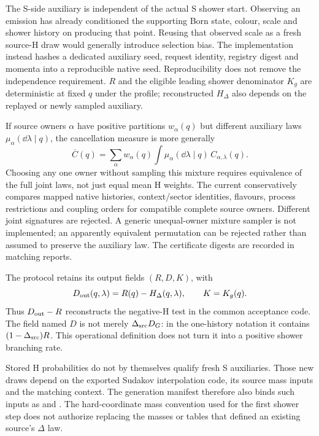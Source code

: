 The S-side auxiliary is independent of the actual S shower start.
Observing an emission has already conditioned the supporting Born
state, colour, scale and shower history on producing that point.
Reusing that observed scale as a fresh source-H draw would generally
introduce selection bias.
The implementation instead hashes a dedicated auxiliary seed, request
identity, registry digest and momenta into a reproducible native seed.
Reproducibility does not remove the independence requirement.
$R$ and the eligible leading shower denominator $K_g$ are deterministic
at fixed $q$ under the profile; reconstructed $H_\Delta$ also depends
on the replayed or newly sampled auxiliary.

If source owners $\alpha$ have positive partitions $w_\alpha(q)$
but different auxiliary laws $\mu_\alpha(\dd\lambda\mid q)$,
the cancellation measure is more generally
\begin{equation}
 \overline C(q)=
   \sum_\alpha w_\alpha(q)
       \int \mu_\alpha(\dd\lambda\mid q)\,C_{\alpha,\lambda}(q).
 \label{eq:delta-owner-mixture}
\end{equation}
Choosing any one owner without sampling this mixture requires
equivalence of the full joint laws, not just equal mean H weights.
The current
conservatively compares mapped native histories, context/sector
identities, flavours, process restrictions and coupling orders
for compatible complete source owners.
Different joint signatures are rejected.
A generic unequal-owner mixture sampler is not implemented;
an apparently equivalent permutation can be rejected rather than
assumed to preserve the auxiliary law.
The certificate digests are recorded in matching reports.

The protocol retains its output fields $(R,D,K)$, with
\begin{equation}
 D_{\rm out}(q,\lambda)=R(q)-H_\Delta(q,\lambda),
 \qquad K=K_g(q).
 \label{eq:delta-protocol-subtraction}
\end{equation}
Thus $D_{\rm out}-R$ reconstructs the negative-H test in the common
acceptance code.
The field named $D$ is not merely $\Delta_{\rm src}D_G$:
in the one-history notation it contains
$(1-\Delta_{\rm src})R$.
This operational definition does not turn it into a positive
shower branching rate.

Stored H probabilities do not by themselves qualify fresh S auxiliaries.
Those new draws depend on the exported Sudakov interpolation code,
its source mass inputs and the matching context.
The generation manifest therefore also binds such inputs as
 and
.
The hard-coordinate mass convention used for the first shower step
does not authorize replacing the masses or tables that defined an
existing source's $\Delta$ law.

